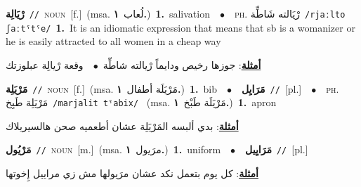 \documentclass[10pt,a4paper,twoside]{article} %
\begin{document}
\begin{multicols}{2}
{\setlength\topsep{0pt}\textbf{\foreignlanguage{arabic}{رْيَالِة}}\ {\color{gray}\texttt{//}\color{black}}\ \textsc{noun}\ [f.]\ \color{gray}(msa. \foreignlanguage{arabic}{لُعاب}~\foreignlanguage{arabic}{\textbf{١.}})\color{black}\ \textbf{1.}~salivation\ \ $\bullet$\ \ \textsc{ph.} \color{gray} \foreignlanguage{arabic}{رْيَالته شَاطِّة}\color{black}\ {\color{gray}\texttt{/{\sffamily rjaːlto ʃaːtˤtˤe}/}\color{black}}\ \textbf{1.}~It is an idiomatic expression that means that sb is a womanizer or he is easily attracted to all women in a cheap way\  \begin{flushright}\color{gray}\foreignlanguage{arabic}{\textbf{\underline{\foreignlanguage{arabic}{أمثلة}}}: جوزها رخيص ودايماً رْيالته شاطِّة\ $\bullet$\ \  وقعة رْيالِة عبلوزتك}\end{flushright}\color{black}} \vspace{2mm}

{\setlength\topsep{0pt}\textbf{\foreignlanguage{arabic}{مَرْيَلِة}}\ {\color{gray}\texttt{//}\color{black}}\ \textsc{noun}\ [f.]\ \color{gray}(msa. \foreignlanguage{arabic}{مَرْيَلَة أطفال}~\foreignlanguage{arabic}{\textbf{١.}})\color{black}\ \textbf{1.}~bib\ \ $\bullet$\ \ \setlength\topsep{0pt}\textbf{\foreignlanguage{arabic}{مَرَايِل}}\ {\color{gray}\texttt{//}\color{black}}\ [pl.]\ \ $\bullet$\ \ \textsc{ph.} \color{gray} \foreignlanguage{arabic}{مَرْيَلِة طَبِخ}\color{black}\ {\color{gray}\texttt{/{\sffamily marjalit tˤabix}/}\color{black}}\ \color{gray} (msa. \foreignlanguage{arabic}{مَرْيَلَة طَبْخ}~\foreignlanguage{arabic}{\textbf{١.}})\color{black}\ \textbf{1.}~apron\  \begin{flushright}\color{gray}\foreignlanguage{arabic}{\textbf{\underline{\foreignlanguage{arabic}{أمثلة}}}: بدي ألبسه المَرْيَلِة عشان أطعميه صحن هالسيريلاك}\end{flushright}\color{black}} \vspace{2mm}

{\setlength\topsep{0pt}\textbf{\foreignlanguage{arabic}{مَرْيُول}}\ {\color{gray}\texttt{//}\color{black}}\ \textsc{noun}\ [m.]\ \color{gray}(msa. \foreignlanguage{arabic}{مرَيول}~\foreignlanguage{arabic}{\textbf{١.}})\color{black}\ \textbf{1.}~uniform\ \ $\bullet$\ \ \setlength\topsep{0pt}\textbf{\foreignlanguage{arabic}{مَرَايِيل}}\ {\color{gray}\texttt{//}\color{black}}\ [pl.]\  \begin{flushright}\color{gray}\foreignlanguage{arabic}{\textbf{\underline{\foreignlanguage{arabic}{أمثلة}}}: كل يوم بتعمل نكد عشان مرَيولها مش زي مراييل إِخوتها}\end{flushright}\color{black}} \vspace{2mm}

\end{multicols}
\end{document}
